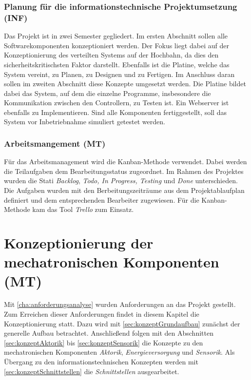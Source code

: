 \subsection{Planung für die informationstechnische Projektumsetzung (INF)}
Das Projekt ist in zwei Semester gegliedert. Im ersten Abschnitt sollen alle Softwarekomponenten konzeptioniert werden. Der Fokus liegt dabei auf der Konzeptionierung des verteilten Systems auf der Hochbahn, da dies den sicherheitskritischsten Faktor darstellt. Ebenfalls ist die Platine, welche das System vereint, zu Planen, zu Designen und zu Fertigen. Im Anschluss daran sollen im zweiten Abschnitt diese Konzepte umgesetzt werden. Die Platine bildet dabei das System, auf dem die einzelne Programme, insbesondere die Kommunikation zwischen den Controllern, zu Testen ist. Ein Webserver ist ebenfalls zu Implementieren.
Sind alle Komponenten fertiggestellt, soll das System vor Inbetriebnahme simuliert getestet werden.

\subsection{Arbeitsmangement (MT)}
\label{sec:arbeitsmanagement}
Für das Arbeitsmanagement wird die Kanban-Methode verwendet. Dabei werden die Teilaufgaben dem Bearbeitungsstatus zugeordnet. Im Rahmen des Projektes wurden die Stati \textit{Backlog}, \textit{Todo,  In Progress, Testing} und \textit{Done}  unterschieden. 
Die Aufgaben wurden mit den Berbeitungszeiträume aus dem Projektablaufplan definiert und dem entsprechenden Bearbeiter zugewiesen. 	
Für die Kanban-Methode kam das Tool \textit{Trello} zum Einsatz. 



\chapter{Konzeptionierung der mechatronischen Komponenten (MT)}
\label{cha:konzeptionierung}
Mit \autoref{cha:anforderungsanalyse} wurden Anforderungen an das Projekt gestellt. Zum Erreichen dieser Anforderungen findet in diesem Kapitel die Konzeptionierung statt. Dazu wird mit \autoref{sec:konzeptGrundaufbau} zunächst der generelle Aufbau betrachtet. Anschließend folgen mit den Abschnitten \ref{sec:konzeptAktorik} bis \ref{sec:konzeptSensorik} die Konzepte zu den mechatronischen Komponenten \textit{Aktorik}, \textit{Energieversorgung} und \textit{Sensorik}. Als Übergang zu den informationstechnischen Konzepten werden mit \autoref{sec:konzeptSchnittstellen} die \textit{Schnittstellen} ausgearbeitet. \newpage


